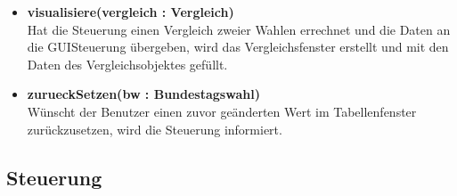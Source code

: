 \documentclass[12pt,a4paper,titlepage]{article}
\begin{document}
\begin{description}
\begin{itemize}
\item \textbf {visualisiere(vergleich : Vergleich)} \\
Hat die Steuerung einen Vergleich zweier Wahlen errechnet und die Daten an die GUISteuerung übergeben,
wird das Vergleichsfenster erstellt und mit den Daten des Vergleichsobjektes gefüllt. \\
\item \textbf {zurueckSetzen(bw : Bundestagswahl)} \\
Wünscht der Benutzer einen zuvor geänderten Wert im Tabellenfenster zurückzusetzen, wird die Steuerung 
informiert. \\
\end{itemize}
\end{description}

\newpage

\subsection{Steuerung}
\begin{figure}

\end{figure}

\newpage
\end{document}
